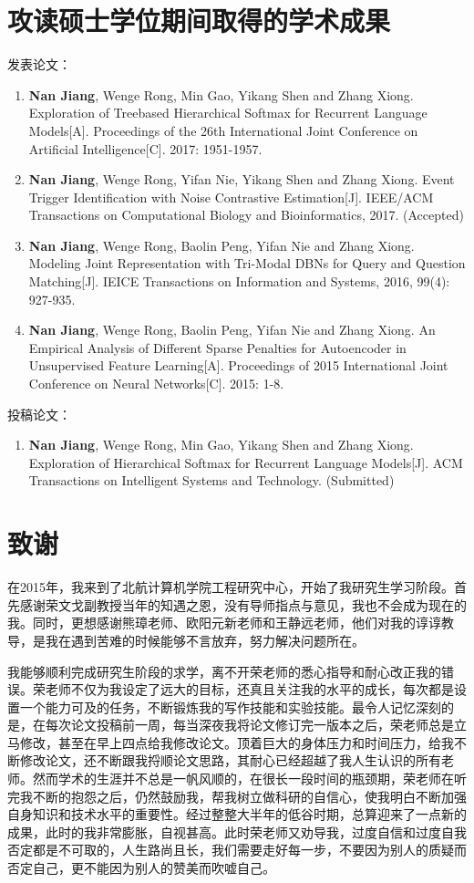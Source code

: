 \chapter{攻读硕士学位期间取得的学术成果}
\noindent 发表论文：
\begin{enumerate}[label=\arabic*.]
\item \textbf{Nan Jiang}, Wenge Rong, Min Gao, Yikang Shen and Zhang Xiong. Exploration of Treebased Hierarchical Softmax for Recurrent Language Models[A]. Proceedings of the 26th International Joint Conference on Artificial Intelligence[C]. 2017: 1951-1957.
\item \textbf{Nan Jiang}, Wenge Rong, Yifan Nie, Yikang Shen and Zhang Xiong. Event Trigger Identification with Noise Contrastive Estimation[J]. IEEE/ACM Transactions on Computational Biology and Bioinformatics, 2017. (Accepted)
\item \textbf{Nan Jiang}, Wenge Rong, Baolin Peng, Yifan Nie and Zhang Xiong. Modeling Joint Representation with Tri-Modal DBNs for Query and Question Matching[J]. IEICE Transactions on Information and Systems, 2016, 99(4): 927-935.
\item \textbf{Nan Jiang}, Wenge Rong, Baolin Peng, Yifan Nie and Zhang Xiong. An Empirical Analysis of Different Sparse Penalties for Autoencoder in Unsupervised Feature Learning[A]. Proceedings of 2015 International Joint Conference on Neural Networks[C]. 2015: 1-8.
\end{enumerate}
\noindent 投稿论文：
\begin{enumerate}[label=\arabic*]
\item \textbf{Nan Jiang}, Wenge Rong, Min Gao, Yikang Shen and Zhang Xiong. Exploration of Hierarchical Softmax for Recurrent Language Models[J]. ACM Transactions on Intelligent Systems and Technology. (Submitted)
\end{enumerate}
\chapter{致\quad 谢}
在2015年，我来到了北航计算机学院工程研究中心，开始了我研究生学习阶段。首先感谢荣文戈副教授当年的知遇之恩，没有导师指点与意见，我也不会成为现在的我。同时，更想感谢熊璋老师、欧阳元新老师和王静远老师，他们对我的谆谆教导，是我在遇到苦难的时候能够不言放弃，努力解决问题所在。

我能够顺利完成研究生阶段的求学，离不开荣老师的悉心指导和耐心改正我的错误。荣老师不仅为我设定了远大的目标，还真且关注我的水平的成长，每次都是设置一个能力可及的任务，不断锻炼我的写作技能和实验技能。最令人记忆深刻的是，在每次论文投稿前一周，每当深夜我将论文修订完一版本之后，荣老师总是立马修改，甚至在早上四点给我修改论文。顶着巨大的身体压力和时间压力，给我不断修改论文，还不断跟我捋顺论文思路，其耐心已经超越了我人生认识的所有老师。然而学术的生涯并不总是一帆风顺的，在很长一段时间的瓶颈期，荣老师在听完我不断的抱怨之后，仍然鼓励我，帮我树立做科研的自信心，使我明白不断加强自身知识和技术水平的重要性。经过整整大半年的低谷时期，总算迎来了一点新的成果，此时的我非常膨胀，自视甚高。此时荣老师又劝导我，过度自信和过度自我否定都是不可取的，人生路尚且长，我们需要走好每一步，不要因为别人的质疑而否定自己，更不能因为别人的赞美而吹嘘自己。

